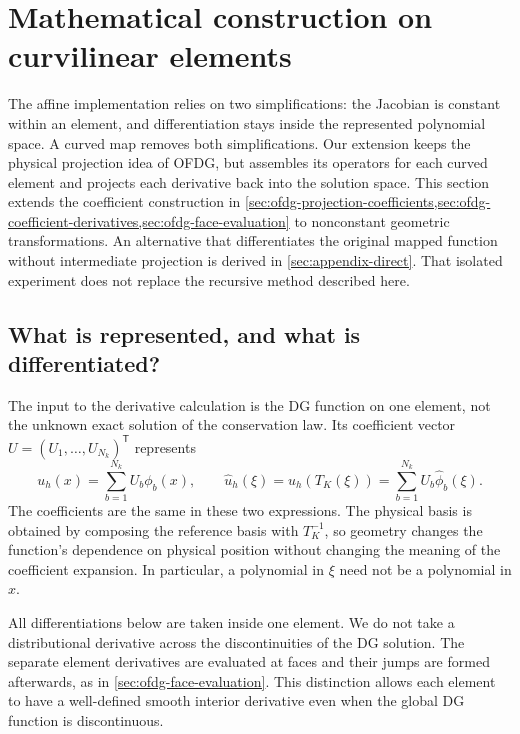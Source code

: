 \section{Mathematical construction on curvilinear elements}
\label{sec:curvilinear-mathematics}
The affine implementation relies on two simplifications: the Jacobian is
constant within an element, and differentiation stays inside the represented
polynomial space. A curved map removes both simplifications. Our extension
keeps the physical projection idea of OFDG, but assembles its operators for
each curved element and projects each derivative back into the solution space.
This section extends the coefficient construction in
\cref{sec:ofdg-projection-coefficients,sec:ofdg-coefficient-derivatives,sec:ofdg-face-evaluation}
to nonconstant geometric transformations.
An alternative that differentiates the original mapped function without
intermediate projection is derived in \cref{sec:appendix-direct}. That isolated
experiment does not replace the recursive method described here.

\subsection{What is represented, and what is differentiated?}
The input to the derivative calculation is the DG function on one element,
not the unknown exact solution of the conservation law. Its coefficient
vector $U=(U_1,\ldots,U_{N_k})^{\mathsf T}$ represents
\begin{equation}
 u_h(x)=\sum_{b=1}^{N_k}U_b\phi_b(x),\qquad
 \widehat u_h(\xi)=u_h(T_K(\xi))
                 =\sum_{b=1}^{N_k}U_b\widehat\phi_b(\xi).
 \label{eq:curved-stored-function}
\end{equation}
The coefficients are the same in these two expressions. The physical basis
is obtained by composing the reference basis with $T_K^{-1}$, so geometry
changes the function's dependence on physical position without changing the
meaning of the coefficient expansion. In particular, a polynomial in $\xi$
need not be a polynomial in $x$.

All differentiations below are taken inside one element. We do not take a
distributional derivative across the discontinuities of the DG solution.
The separate element derivatives are evaluated at faces and their jumps are
formed afterwards, as in \cref{sec:ofdg-face-evaluation}. This distinction
allows each element to have a well-defined smooth interior derivative even
when the global DG function is discontinuous.

